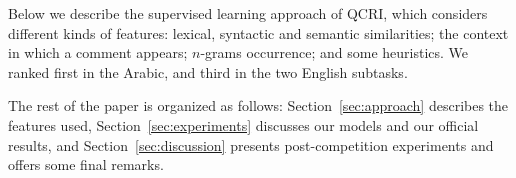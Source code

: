 Below we describe the supervised learning approach of QCRI\@,
which considers different kinds of features: lexical, syntactic and semantic similarities; 
the context in which a comment appears; $n$-grams occurrence; and some heuristics.
We ranked first in the Arabic, and third in the two English subtasks.

The rest of the paper is organized as follows:
Section~\ref{sec:approach} describes the features used,
Section~\ref{sec:experiments} discusses our models and our official results, and
Section~\ref{sec:discussion} presents post-competition experiments and offers some final remarks.
